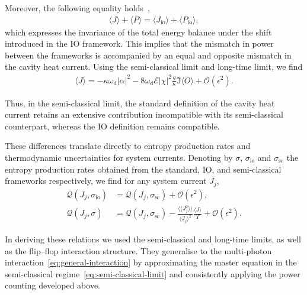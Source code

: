 \documentclass[aps,twocolumn,10pt,prl,floatfix,nofootinbib, superscriptaddress]{revtex4-2}
\begin{document}
Moreover, the following equality holds~\cite{schrauwen2025},
\begin{align}
    \langle J \rangle + \langle P \rangle = \langle J_\text{io} \rangle + \langle P_\text{io} \rangle,
\end{align}
which expresses the invariance of the total energy balance under the shift introduced in the IO framework.
This implies that the mismatch in power between the frameworks is accompanied by an equal and opposite mismatch in the cavity heat current.
Using the semi-classical limit and long-time limit, we find
\begin{align}
   \langle J \rangle = -\kappa \omega_\text{d}|\alpha|^2 - 8 \omega_\text{d} \mathcal{E}|\chi|^2\frac{g}{\kappa}\Im \langle O \rangle + \mathcal{O}(\epsilon^2).\label{eq:heat-expansion}
\end{align}



Thus, in the semi-classical limit, the standard definition of the cavity heat current retains an extensive contribution incompatible with its semi-classical counterpart, whereas the IO definition remains compatible.

These differences translate directly to entropy production rates and thermodynamic uncertainties for system currents.
Denoting by $\sigma$, $\sigma_\text{io}$ and $\sigma_\text{sc}$ the entropy production rates obtained from the standard, IO, and semi-classical frameworks respectively, we find for any system current $J_j$,
\begin{align}
    \mathcal{Q}(J_j, \sigma_\text{io}) &= \mathcal{Q}(J_j, \sigma_\text{sc}) + \mathcal{O}(\epsilon^2), \\
    \mathcal{Q}(J_j, \sigma) &= \mathcal{Q}(J_j, \sigma_\text{sc}) -  \frac{\langle \!\langle J_j^2 \rangle\!\rangle}{\langle J_j \rangle ^2} \frac{\langle J \rangle }{T}
    + \mathcal{O}(\epsilon^2).
\end{align}

In deriving these relations we used the semi-classical and long-time limits, as well as the flip--flop interaction structure.
They generalise to the multi-photon interaction~\eqref{eq:general-interaction} by approximating the master equation in the semi-classical regime~\eqref{eq:semi-classical-limit} and consistently applying the power counting developed above.
\end{document}
